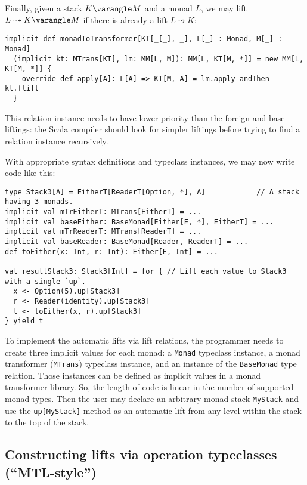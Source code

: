 Finally, given a stack $K\varangle M$ and a monad $L$, we may lift
$L\leadsto K\varangle M$ if there is already a lift $L\leadsto K$:
\begin{lstlisting}
implicit def monadToTransformer[KT[_[_], _], L[_] : Monad, M[_] : Monad]
  (implicit kt: MTrans[KT], lm: MM[L, M]): MM[L, KT[M, *]] = new MM[L, KT[M, *]] {
    override def apply[A]: L[A] => KT[M, A] = lm.apply andThen kt.flift
  }
\end{lstlisting}
This relation instance needs to have lower priority than the foreign
and base liftings: the Scala compiler should look for simpler liftings
before trying to find a relation instance recursively.

With appropriate syntax definitions and typeclass instances, we may
now write code like this:
\begin{lstlisting}
type Stack3[A] = EitherT[ReaderT[Option, *], A]            // A stack having 3 monads.
implicit val mTrEitherT: MTrans[EitherT] = ...
implicit val baseEither: BaseMonad[Either[E, *], EitherT] = ...
implicit val mTrReaderT: MTrans[ReaderT] = ...
implicit val baseReader: BaseMonad[Reader, ReaderT] = ...
def toEither(x: Int, r: Int): Either[E, Int] = ...

val resultStack3: Stack3[Int] = for { // Lift each value to Stack3 with a single `up`. 
  x <- Option(5).up[Stack3]
  r <- Reader(identity).up[Stack3]
  t <- toEither(x, r).up[Stack3]
} yield t
\end{lstlisting}

To implement the automatic lifts via lift relations, the programmer
needs to create three implicit values for each monad: a \lstinline!Monad!
typeclass instance, a monad transformer (\lstinline!MTrans!) typeclass
instance, and an instance of the \lstinline!BaseMonad! type relation.
Those instances can be defined as implicit values in a monad transformer
library. So, the length of code is linear in the number of supported
monad types. Then the user may declare an arbitrary monad stack \lstinline!MyStack!
and use the \lstinline!up[MyStack]! method as an automatic lift from
any level within the stack to the top of the stack.

\subsection{Constructing lifts via operation typeclasses (\textquotedblleft MTL-style\textquotedblright )\label{subsec:Combining-monads-via-mtl-style}}

